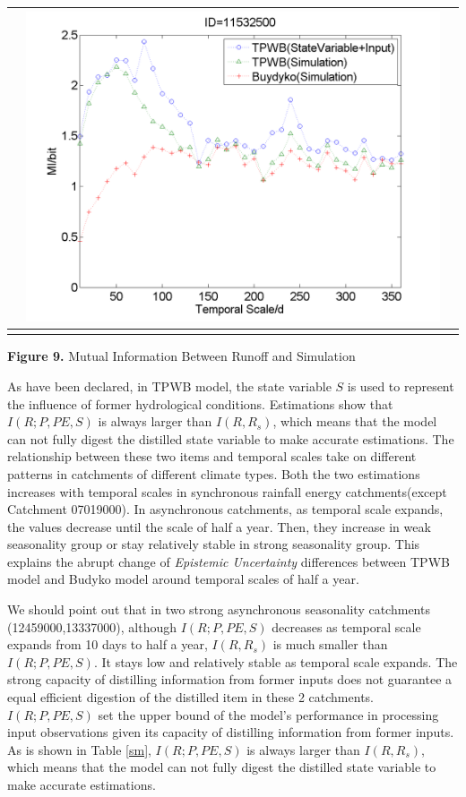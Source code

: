 \documentclass[review]{elsarticle}
\begin{document}
\begin{table}[H]
{\begin{tabular}{ccc}
&\begin{minipage}{.6\textwidth}\includegraphics[width=\linewidth]{resultgraph/11532500MI.png}\end{minipage}
\\
\hline
\\
\end{tabular}
}
\Large{\textbf{Figure 9.} Mutual Information Between Runoff and Simulation}
\end{table}

As have been declared, in TPWB model,  the state variable $S$ is used to  represent the influence of former hydrological conditions. Estimations show that $I(R;P,PE,S)$ is always larger than $I(R,R_s)$, which means that 
the model can not fully  digest the distilled state variable to make accurate estimations. The relationship between these two items and temporal scales take on different patterns in catchments of different climate types. Both the two estimations increases with temporal scales in synchronous rainfall energy catchments(except Catchment 07019000). In asynchronous catchments, as temporal scale expands, the values decrease until the scale of half a year. Then, they increase in weak seasonality group or stay relatively stable in strong seasonality group. This explains the abrupt change of \emph{Epistemic Uncertainty} differences between TPWB model and Budyko model around temporal scales of half a year. 

We should point out that in two strong asynchronous seasonality catchments (12459000,13337000), although $I(R;P,PE,S)$ decreases as temporal scale expands from 10 days to half a year, $I(R,R_s)$ is much smaller than $I(R;P,PE,S)$. It stays low and relatively stable as temporal scale expands. The strong  capacity of distilling information from former inputs does not guarantee a equal efficient digestion of the distilled item in these 2 catchments. 
\iffalse
$I(R;P,PE,S)$ set the upper bound of the model's performance in processing input observations given its capacity of distilling information from former inputs. As is shown in Table \ref{sm}, $I(R;P,PE,S)$ is always larger than $I(R,R_s)$, which means that the model can not fully  digest the distilled state variable to make accurate estimations. 
\end{document}
